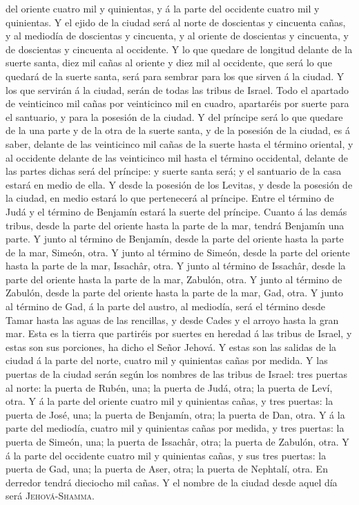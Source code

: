 del oriente cuatro mil y quinientas, y á la parte del occidente cuatro
mil y quinientas.  Y el ejido de la ciudad será al norte
de doscientas y cincuenta cañas, y al mediodía de doscientas y
cincuenta, y al oriente de doscientas y cincuenta, y de doscientas y
cincuenta al occidente.  Y lo que quedare de longitud
delante de la suerte santa, diez mil cañas al oriente y diez mil al
occidente, que será lo que quedará de la suerte santa, será para sembrar
para los que sirven á la ciudad.  Y los que servirán á la
ciudad, serán de todas las tribus de Israel.  Todo el
apartado de veinticinco mil cañas por veinticinco mil en cuadro,
apartaréis por suerte para el santuario, y para la posesión de la
ciudad.  Y del príncipe será lo que quedare de la una
parte y de la otra de la suerte santa, y de la posesión de la ciudad, es
á saber, delante de las veinticinco mil cañas de la suerte hasta el
término oriental, y al occidente delante de las veinticinco mil hasta el
término occidental, delante de las partes dichas será del príncipe: y
suerte santa será; y el santuario de la casa estará en medio de ella.
 Y desde la posesión de los Levitas, y desde la posesión
de la ciudad, en medio estará lo que pertenecerá al príncipe. Entre el
término de Judá y el término de Benjamín estará la suerte del príncipe.
 Cuanto á las demás tribus, desde la parte del oriente
hasta la parte de la mar, tendrá Benjamín una parte.  Y
junto al término de Benjamín, desde la parte del oriente hasta la parte
de la mar, Simeón, otra.  Y junto al término de Simeón,
desde la parte del oriente hasta la parte de la mar, Issachâr, otra.
 Y junto al término de Issachâr, desde la parte del
oriente hasta la parte de la mar, Zabulón, otra.  Y junto
al término de Zabulón, desde la parte del oriente hasta la parte de la
mar, Gad, otra.  Y junto al término de Gad, á la parte
del austro, al mediodía, será el término desde Tamar hasta las aguas de
las rencillas, y desde Cades y el arroyo hasta la gran mar.
 Esta es la tierra que partiréis por suertes en heredad á
las tribus de Israel, y estas son sus porciones, ha dicho el Señor
Jehová.  Y estas son las salidas de la ciudad á la parte
del norte, cuatro mil y quinientas cañas por medida.  Y
las puertas de la ciudad serán según los nombres de las tribus de
Israel: tres puertas al norte: la puerta de Rubén, una; la puerta de
Judá, otra; la puerta de Leví, otra.  Y á la parte del
oriente cuatro mil y quinientas cañas, y tres puertas: la puerta de
José, una; la puerta de Benjamín, otra; la puerta de Dan, otra.
 Y á la parte del mediodía, cuatro mil y quinientas cañas
por medida, y tres puertas: la puerta de Simeón, una; la puerta de
Issachâr, otra; la puerta de Zabulón, otra.  Y á la parte
del occidente cuatro mil y quinientas cañas, y sus tres puertas: la
puerta de Gad, una; la puerta de Aser, otra; la puerta de Nephtalí,
otra.  En derredor tendrá dieciocho mil cañas. Y el
nombre de la ciudad desde aquel día será
\textsc{Jehová}-\textsc{Shamma}.
